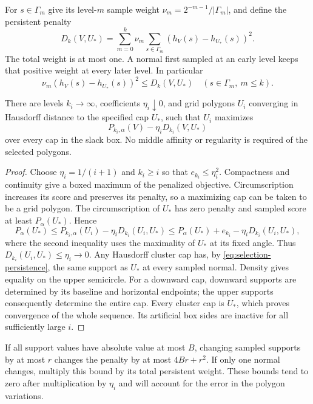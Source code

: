 For $s\in\Gamma_m$ give its level-$m$ sample weight
$\nu_m=2^{-m-1}/|\Gamma_m|$, and define the persistent penalty
\begin{equation}\label{eq:selection-penalty}
 D_k(V,U_*)=\sum_{m=0}^k\nu_m\sum_{s\in\Gamma_m}
                   (h_V(s)-h_{U_*}(s))^2.
\end{equation}
The total weight is at most one. A normal first sampled at an early
level keeps that positive weight at every later level. In particular
\begin{equation}\label{eq:selection-persistence}
 \nu_m(h_V(s)-h_{U_*}(s))^2\le D_k(V,U_*)
 \quad(s\in\Gamma_m,\ m\le k).
\end{equation}

\begin{theorem}\label{thm:selection-prescribed}
There are levels $k_i\to\infty$, coefficients $\eta_i\downarrow0$,
and grid polygons $U_i$ converging in Hausdorff distance to the
specified cap $U_*$, such that $U_i$ maximizes
\[
 P_{k_i,\alpha}(V)-\eta_iD_{k_i}(V,U_*)
\]
over every cap in the slack box. No middle affinity or regularity
is required of the selected polygons.
\end{theorem}

\begin{proof}
Choose $\eta_i=1/(i+1)$ and $k_i\ge i$ so that $e_{k_i}\le\eta_i^2$.
Compactness and continuity give a boxed maximum of the penalized
objective. Circumscription increases its score and preserves its
penalty, so a maximizing cap can be taken to be a grid polygon.
The circumscription of $U_*$ has zero penalty and sampled score at
least $P_\alpha(U_*)$. Hence
\[
 P_\alpha(U_*)\le P_{k_i,\alpha}(U_i)-\eta_iD_{k_i}(U_i,U_*)
 \le P_\alpha(U_*)+e_{k_i}-\eta_iD_{k_i}(U_i,U_*),
\]
where the second inequality uses the maximality of $U_*$ at its
fixed angle. Thus $D_{k_i}(U_i,U_*)\le\eta_i\to0$.
Any Hausdorff cluster cap has, by \eqref{eq:selection-persistence},
the same support as $U_*$ at every sampled normal. Density gives
equality on the upper semicircle. For a downward cap, downward
supports are determined by its baseline and horizontal endpoints;
the upper supports consequently determine the entire cap. Every
cluster cap is $U_*$, which proves convergence of the whole sequence.
Its artificial box sides are inactive for all sufficiently large $i$.
\end{proof}

If all support values have absolute value at most $B$, changing
sampled supports by at most $r$ changes the penalty by at most
$4Br+r^2$. If only one normal changes, multiply this bound by its
total persistent weight. These bounds tend to zero after multiplication
by $\eta_i$ and will account for the error in the polygon variations.
